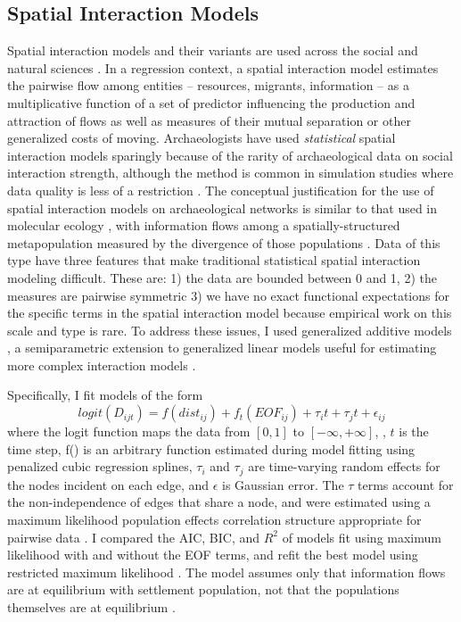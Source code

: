 \documentclass[10pt]{iopart}
\begin{document}
\subsection*{Spatial Interaction Models}
Spatial interaction models and their variants are used across the social and natural sciences \parencite{Wilson1971,Fotheringham1989,Sen1995,Bavaud2008,Murphy2010,Head2015}. In a regression context, a spatial interaction model estimates the pairwise flow among entities -- resources, migrants, information -- as a multiplicative function of a set of predictor influencing the production and attraction of flows as well as measures of their mutual separation or other generalized costs of moving. Archaeologists have used \textit{statistical} spatial interaction models sparingly \parencite{Tobler1971,Hodder1974,Johnson1990ChumashAnalysis} because of the rarity of archaeological data on social interaction strength, although the method is common in simulation studies where data quality is less of a restriction \parencite{Bevan2013, Evans2011, Davies2014,Paliou2016}. The conceptual justification for the use of spatial interaction models on archaeological networks is similar to that used in molecular ecology \parencite{Murphy2010}, with information flows among a spatially-structured metapopulation measured by the divergence of those populations \parencite{Mesoudi2018}. Data of this type have three features that make traditional statistical spatial interaction modeling difficult. These are: 1) the data are bounded between 0 and 1, 2) the measures are pairwise symmetric 3) we have no exact functional expectations for the specific terms in the spatial interaction model because empirical work on this scale and type is rare. To address these issues, I used generalized additive models \parencite{Wood2006a}, a semiparametric extension to generalized linear models useful for estimating more complex interaction models \parencite{Lebacher2018}.

Specifically, I fit models of the form
\begin{equation}
    logit\left(D_{ijt}\right) = f(dist_{ij}) + f_t(EOF_{ij}) + \tau_it + \tau_jt + \epsilon_{ij}
\end{equation}
where the logit function maps the data from $[0, 1]$ to $[-\infty, +\infty]$, , $t$ is the time step, f() is an arbitrary function estimated during model fitting using penalized cubic regression splines, $\tau_i$ and $\tau_j$ are time-varying random effects for the nodes incident on each edge, and $\epsilon$ is Gaussian error. The $\tau$ terms account for the non-independence of edges that share a node, and were estimated using a maximum likelihood population effects correlation structure appropriate for pairwise data \parencite{Clarke2002}. I compared the AIC, BIC, and $R^2$ of models fit using maximum likelihood with and without the EOF terms, and refit the best model using restricted maximum likelihood \parencite{Clarke2002,Shirk2018}. The model assumes only that information flows are at equilibrium with settlement population, not that the populations themselves are at equilibrium \parencite{Wilson2008}.  
\end{document}
